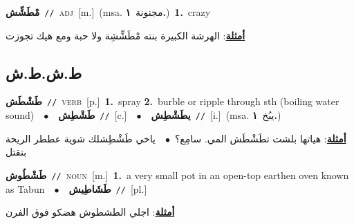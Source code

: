 \documentclass[10pt,a4paper,twoside]{article} %
\begin{document}
\begin{multicols}{2}
{\setlength\topsep{0pt}\textbf{\foreignlanguage{arabic}{مْطَشِّش}}\ {\color{gray}\texttt{//}\color{black}}\ \textsc{adj}\ [m.]\ \color{gray}(msa. \foreignlanguage{arabic}{مجنونة}~\foreignlanguage{arabic}{\textbf{١.}})\color{black}\ \textbf{1.}~crazy\  \begin{flushright}\color{gray}\foreignlanguage{arabic}{\textbf{\underline{\foreignlanguage{arabic}{أمثلة}}}: الهرشة الكبيرة بنته مْطَشِّشِة ولا حبة ومع هيك تجوزت}\end{flushright}\color{black}} \vspace{2mm}

\vspace{-3mm}
\subsection*{\color{blue}\foreignlanguage{arabic}{ط.ش.ط.ش}\color{blue}{}} 

{\setlength\topsep{0pt}\textbf{\foreignlanguage{arabic}{طَشْطَش}}\ {\color{gray}\texttt{//}\color{black}}\ \textsc{verb}\ [p.]\ \textbf{1.}~spray  \textbf{2.}~burble or ripple through sth (boiling water sound)\ \ $\bullet$\ \ \setlength\topsep{0pt}\textbf{\foreignlanguage{arabic}{طَشْطِش}}\ {\color{gray}\texttt{//}\color{black}}\ [c.]\ \ $\bullet$\ \ \setlength\topsep{0pt}\textbf{\foreignlanguage{arabic}{يطَشْطِش}}\ {\color{gray}\texttt{//}\color{black}}\ [i.]\ \color{gray}(msa. \foreignlanguage{arabic}{يبُخ}~\foreignlanguage{arabic}{\textbf{١.}})\color{black}\  \begin{flushright}\color{gray}\foreignlanguage{arabic}{\textbf{\underline{\foreignlanguage{arabic}{أمثلة}}}: هياتها بلشت تطَشْطَش المي. سامِع؟\ $\bullet$\ \  ياخي طَشْطِشلك شوية عططر الريحة بتقتل}\end{flushright}\color{black}} \vspace{2mm}

{\setlength\topsep{0pt}\textbf{\foreignlanguage{arabic}{طَشْطُوش}}\ {\color{gray}\texttt{//}\color{black}}\ \textsc{noun}\ [m.]\ \textbf{1.}~a very small pot in an open-top earthen oven known as Tabun\ \ $\bullet$\ \ \setlength\topsep{0pt}\textbf{\foreignlanguage{arabic}{طَشَاطِيش}}\ {\color{gray}\texttt{//}\color{black}}\ [pl.]\  \begin{flushright}\color{gray}\foreignlanguage{arabic}{\textbf{\underline{\foreignlanguage{arabic}{أمثلة}}}: اجلي الطشطوش هضكو فوق الفرن}\end{flushright}\color{black}} \vspace{2mm}


\end{multicols}
\end{document}
